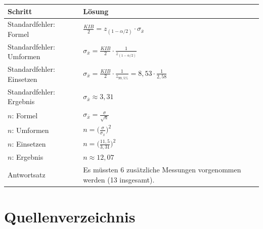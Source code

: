 \documentclass[
  11pt,
  ngerman,
  a4paper,
]{report}
\begin{document}
\begin{table}[H]
\centering
\begin{tabular}{ll}
\toprule
\textbf{Schritt} & \textbf{Lösung}\\
\midrule
Standardfehler: Formel & $\frac{\mathit{KIB}}{2} = z_{(1-\alpha/2)} \cdot \sigma_{\bar{x}}$\\
Standardfehler: Umformen & $\sigma_{\bar{x}} = \frac{\mathit{KIB}}{2} \cdot \frac{1}{z_{(1-\alpha/2)}}$\\
Standardfehler: Einsetzen & $\sigma_{\bar{x}}=\frac{\mathit{KIB}}{2}\cdot \frac{1}{z_{99{,}5\%}} = 8{,}53 \cdot \frac{1}{2{,}58}$\\
Standardfehler: Ergebnis & $\sigma_{\bar{x}} \approx 3{,}31$\\
$n$: Formel & $\sigma_{\bar{x}}=\frac{\sigma}{\sqrt{n}}$\\
$n$: Umformen & $n=\Big(\frac{\sigma}{\sigma_{\bar{x}}}\Big)^2$\\
$n$: Einsetzen & $n=\Big(\frac{11{,}5}{3{,}31}\Big)^2$\\
$n$: Ergebnis & $n\approx12{,}07$\\
Antwortsatz & Es müssten 6 zusätzliche Messungen  vorgenommen werden (13 insgesamt).\\
\bottomrule
\end{tabular}
\end{table}

\hypertarget{quellenverzeichnis}{%
\chapter*{Quellenverzeichnis}\label{quellenverzeichnis}}
\end{document}
